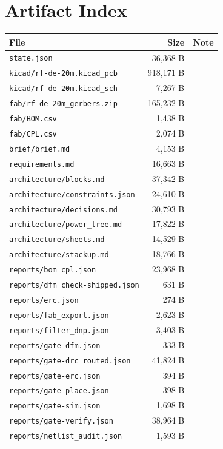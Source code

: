 \documentclass[11pt,a4paper]{article}
\begin{document}
\section{Artifact Index}
{\small
\begin{longtable}{p{9cm}rp{4cm}}
\toprule
\textbf{File} & \textbf{Size} & \textbf{Note} \\
\midrule
\endhead
\texttt{state.json} & 36,368 B &  \\
\texttt{kicad/rf-de-20m.kicad\_pcb} & 918,171 B &  \\
\texttt{kicad/rf-de-20m.kicad\_sch} & 7,267 B &  \\
\texttt{fab/rf-de-20m\_gerbers.zip} & 165,232 B &  \\
\texttt{fab/BOM.csv} & 1,438 B &  \\
\texttt{fab/CPL.csv} & 2,074 B &  \\
\texttt{brief/brief.md} & 4,153 B &  \\
\texttt{requirements.md} & 16,663 B &  \\
\texttt{architecture/blocks.md} & 37,342 B &  \\
\texttt{architecture/constraints.json} & 24,610 B &  \\
\texttt{architecture/decisions.md} & 30,793 B &  \\
\texttt{architecture/power\_tree.md} & 17,822 B &  \\
\texttt{architecture/sheets.md} & 14,529 B &  \\
\texttt{architecture/stackup.md} & 18,766 B &  \\
\texttt{reports/bom\_cpl.json} & 23,968 B &  \\
\texttt{reports/dfm\_check-shipped.json} & 631 B &  \\
\texttt{reports/erc.json} & 274 B &  \\
\texttt{reports/fab\_export.json} & 2,623 B &  \\
\texttt{reports/filter\_dnp.json} & 3,403 B &  \\
\texttt{reports/gate-dfm.json} & 333 B &  \\
\texttt{reports/gate-drc\_routed.json} & 41,824 B &  \\
\texttt{reports/gate-erc.json} & 394 B &  \\
\texttt{reports/gate-place.json} & 398 B &  \\
\texttt{reports/gate-sim.json} & 1,698 B &  \\
\texttt{reports/gate-verify.json} & 38,964 B &  \\
\texttt{reports/netlist\_audit.json} & 1,593 B &  \\

\end{longtable}}
\end{document}
